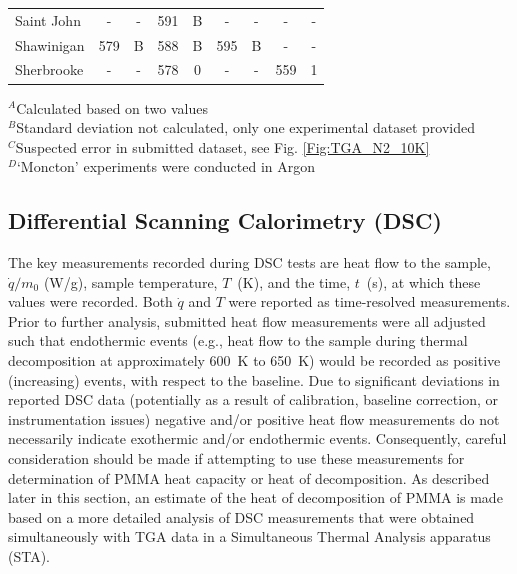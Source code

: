 \documentclass{book}
\begin{document}
\begin{table}[p]
\begin{center}
\begin{tabular}{|l|cc|cc|cc|cc|}
Saint John              & -           & -               & 591            & B                & -          & -                 & -           & -                     \\
Shawinigan              & 579         & B               & 588            & B                & 595        & B                 & -           & -                     \\
Sherbrooke              & -           & -               & 578            & 0                & -          & -                 & 559         & 1                     \\  \hline
\end{tabular}
\end{center}
$^A$Calculated based on two values \\
$^B$Standard deviation not calculated, only one experimental dataset provided \\
$^C$Suspected error in submitted dataset, see Fig. \ref{Fig:TGA_N2_10K} \\
$^D$`Moncton' experiments were conducted in Argon
\end{table}


\newpage
\subsection{Differential Scanning Calorimetry (DSC)}

The key measurements recorded during DSC tests are heat flow to the sample, $\dot{q}/m_0$ (W/g), sample temperature, $T$~(K), and the time, $t$~(s), at which these values were recorded.  Both $\dot{q}$ and $T$ were reported as time-resolved measurements. Prior to further analysis, submitted heat flow measurements were all adjusted such that endothermic events (e.g., heat flow to the sample during thermal decomposition at approximately 600~K to 650~K) would be recorded as positive (increasing) events, with respect to the baseline. Due to significant deviations in reported DSC data (potentially as a result of calibration, baseline correction, or instrumentation issues) negative and/or positive heat flow measurements do not necessarily indicate exothermic and/or endothermic events. Consequently, careful consideration should be made if attempting to use these measurements for determination of PMMA heat capacity or heat of decomposition. As described later in this section, an estimate of the heat of decomposition of PMMA is made based on a more detailed analysis of DSC measurements that were obtained simultaneously with TGA data in a Simultaneous Thermal Analysis apparatus (STA).
\end{document}
